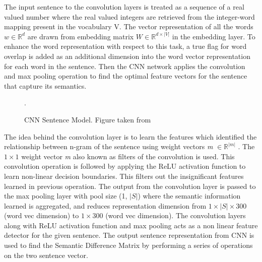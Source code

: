 \documentclass[12pt]{report} %
\begin{document}
	The input sentence to the convolution layers is treated as a sequence of a real valued number where the real valued integers are retrieved from the integer-word mapping present in the vocabulary V. The vector representation of all the words $ w \in \mathbb{R}^{d}  $ are drawn from embedding matrix  $ W \in \mathbb{R}^{d \times |V|} $ in the embedding layer. To enhance the word representation with respect to this task, a true flag for word overlap is added as an additional dimension into the word vector representation for each word in the sentence. Then the CNN network applies the convolution and max pooling operation to find the optimal feature vectors for the sentence that capture its semantics. 
	
		\begin{figure}[hbp]
			\centering
			\label{CNN_1}
			\caption{CNN Sentence Model. Figure taken from \cite{severyn2015learning}}.
		\end{figure}
		
	
	The idea behind the convolution layer is to learn the features which identified the relationship between n-gram of the sentence using weight vectors \textit{m} $\in \mathbb{R}^{|m|}$ . The $1 \times 1$ weight vector \textit{m} also known as filters of the convolution is used. This convolution operation is followed by applying the ReLU activation function to learn non-linear decision boundaries. This filters out the insignificant features learned in previous operation. The output from the convolution layer is passed to the max pooling layer with pool size (1, $|S|$) where the semantic information learned is aggregated, and reduces representation dimension from $1 \times |S| \times 300$ (word vec dimension) to $1 \times 300$ (word vec dimension). The convolution layers along with ReLU activation function and max pooling acts as a non linear  feature detector for the given sentence. The output sentence representation from CNN is used to find the Semantic Difference Matrix by performing a series of operations on the two sentence vector. 
		
\end{document}
